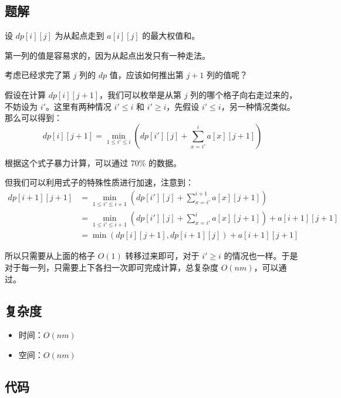 \documentclass{article}
\begin{document}
\subsection*{题解}
设 $dp[i][j]$ 为从起点走到 $a[i][j]$ 的最大权值和。

第一列的值是容易求的，因为从起点出发只有一种走法。

考虑已经求完了第 $j$ 列的 $dp$ 值，应该如何推出第 $j+1$ 列的值呢？

假设在计算 $dp[i][j+1]$，我们可以枚举是从第 $j$ 列的哪个格子向右走过来的，不妨设为 $i'$。这里有两种情况 $i'\le i$ 和 $i' \ge i$，先假设 $i'\le i$，另一种情况类似。那么可以得到：
$$
dp[i][j+1] = \min_{1\le i'\le i}(dp[i'][j] + \sum_{x = i'}^i a[x][j+1])
$$

根据这个式子暴力计算，可以通过 70\% 的数据。

但我们可以利用式子的特殊性质进行加速，注意到：
\begin{align}
    dp[i+1][j+1] 
    &= \min_{1\le i'\le i+1}(dp[i'][j] + \sum_{x = i'}^{i+1} a[x][j+1])\\
    &= \min_{1\le i'\le i+1}(dp[i'][j] + \sum_{x = i'}^{i} a[x][j+1]) + a[i+1][j+1]  \\
    &= \min(dp[i][j+1],dp[i+1][j]) + a[i+1][j+1]  
\end{align}

所以只需要从上面的格子 $O(1)$ 转移过来即可，对于 $i' \ge i$ 的情况也一样。于是对于每一列，只需要上下各扫一次即可完成计算，总复杂度 $O(nm)$，可以通过。

\subsection*{复杂度}
\begin{itemize}
\item 时间：$O(nm)$
\item 空间：$O(nm)$
\end{itemize}
\subsection*{代码}
\inputminted[linenos,autogobble]{cpp}{T4.cpp}
\end{document}
